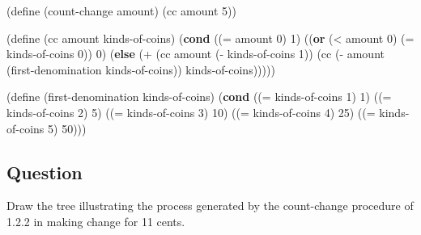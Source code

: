 \documentclass[
]{article}
\newenvironment{Shaded}{}{}
\newcommand{\DecValTok}[1]{\textcolor[rgb]{0.25,0.63,0.44}{#1}}
\newcommand{\ExtensionTok}[1]{#1}
\newcommand{\FunctionTok}[1]{\textcolor[rgb]{0.02,0.16,0.49}{#1}}
\newcommand{\KeywordTok}[1]{\textcolor[rgb]{0.00,0.44,0.13}{\textbf{#1}}}
\newcommand{\NormalTok}[1]{#1}
\newcommand{\OperatorTok}[1]{\textcolor[rgb]{0.40,0.40,0.40}{#1}}
\begin{document}
\hypertarget{count-change}{%
\label{count-change}}%
\begin{Shaded}
\begin{Highlighting}[numbers=left,,]
\NormalTok{(}\ExtensionTok{define}\FunctionTok{ }\NormalTok{(count{-}change amount)}
\NormalTok{  (cc amount }\DecValTok{5}\NormalTok{))}

\NormalTok{(}\ExtensionTok{define}\FunctionTok{ }\NormalTok{(cc amount kinds{-}of{-}coins)}
\NormalTok{  (}\KeywordTok{cond}\NormalTok{ ((}\OperatorTok{=}\NormalTok{ amount }\DecValTok{0}\NormalTok{) }\DecValTok{1}\NormalTok{)}
\NormalTok{        ((}\KeywordTok{or}\NormalTok{ (}\OperatorTok{\textless{}}\NormalTok{ amount }\DecValTok{0}\NormalTok{)}
\NormalTok{             (}\OperatorTok{=}\NormalTok{ kinds{-}of{-}coins }\DecValTok{0}\NormalTok{))}
         \DecValTok{0}\NormalTok{)}
\NormalTok{        (}\KeywordTok{else}
\NormalTok{         (}\OperatorTok{+}\NormalTok{ (cc amount (}\OperatorTok{{-}}\NormalTok{ kinds{-}of{-}coins }\DecValTok{1}\NormalTok{))}
\NormalTok{            (cc (}\OperatorTok{{-}}\NormalTok{ amount (first{-}denomination}
\NormalTok{                           kinds{-}of{-}coins))}
\NormalTok{                kinds{-}of{-}coins)))))}

\NormalTok{(}\ExtensionTok{define}\FunctionTok{ }\NormalTok{(first{-}denomination kinds{-}of{-}coins)}
\NormalTok{  (}\KeywordTok{cond}\NormalTok{ ((}\OperatorTok{=}\NormalTok{ kinds{-}of{-}coins }\DecValTok{1}\NormalTok{) }\DecValTok{1}\NormalTok{)}
\NormalTok{        ((}\OperatorTok{=}\NormalTok{ kinds{-}of{-}coins }\DecValTok{2}\NormalTok{) }\DecValTok{5}\NormalTok{)}
\NormalTok{        ((}\OperatorTok{=}\NormalTok{ kinds{-}of{-}coins }\DecValTok{3}\NormalTok{) }\DecValTok{10}\NormalTok{)}
\NormalTok{        ((}\OperatorTok{=}\NormalTok{ kinds{-}of{-}coins }\DecValTok{4}\NormalTok{) }\DecValTok{25}\NormalTok{)}
\NormalTok{        ((}\OperatorTok{=}\NormalTok{ kinds{-}of{-}coins }\DecValTok{5}\NormalTok{) }\DecValTok{50}\NormalTok{)))}
\end{Highlighting}
\end{Shaded}

\hypertarget{question-13}{%
\subsection{Question}\label{question-13}}

Draw the tree illustrating the process generated by the count-change
procedure of 1.2.2 in making change for 11 cents.
\end{document}
